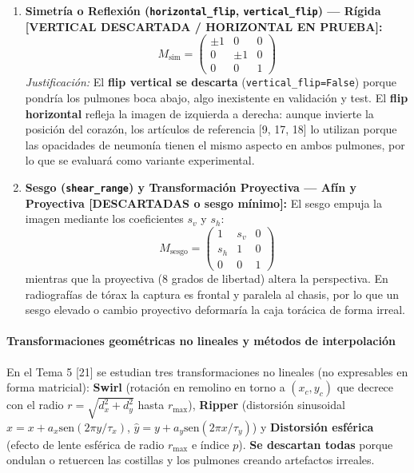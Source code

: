 \documentclass[11pt, a4paper]{article}
\numberwithin{equation}{section}
\begin{document}
\begin{enumerate}
    \item \textbf{Simetría o Reflexión (\texttt{horizontal\_flip}, \texttt{vertical\_flip}) --- Rígida [VERTICAL DESCARTADA / HORIZONTAL EN PRUEBA]:}
    \begin{equation}
        M_{\text{sim}} = \begin{pmatrix} \pm 1 & 0 & 0 \\ 0 & \pm 1 & 0 \\ 0 & 0 & 1 \end{pmatrix}
    \end{equation}
    \textit{Justificación:} El \textbf{flip vertical se descarta} (\texttt{vertical\_flip=False}) porque pondría los pulmones boca abajo, algo inexistente en validación y test. El \textbf{flip horizontal} refleja la imagen de izquierda a derecha: aunque invierte la posición del corazón, los artículos de referencia [9, 17, 18] lo utilizan porque las opacidades de neumonía tienen el mismo aspecto en ambos pulmones, por lo que se evaluará como variante experimental.

    \item \textbf{Sesgo (\texttt{shear\_range}) y Transformación Proyectiva --- Afín y Proyectiva [DESCARTADAS o sesgo mínimo]:}
    El sesgo empuja la imagen mediante los coeficientes $s_v$ y $s_h$:
    \begin{equation}
        M_{\text{sesgo}} = \begin{pmatrix} 1 & s_v & 0 \\ s_h & 1 & 0 \\ 0 & 0 & 1 \end{pmatrix}
    \end{equation}
    mientras que la proyectiva (8 grados de libertad) altera la perspectiva. En radiografías de tórax la captura es frontal y paralela al chasis, por lo que un sesgo elevado o cambio proyectivo deformaría la caja torácica de forma irreal.
\end{enumerate}

\paragraph{Transformaciones geométricas no lineales y métodos de interpolación}
En el Tema 5 [21] se estudian tres transformaciones no lineales (no expresables en forma matricial): \textbf{Swirl} (rotación en remolino en torno a $(x_c, y_c)$ que decrece con el radio $r = \sqrt{d_x^2 + d_y^2}$ hasta $r_{\max}$), \textbf{Ripper} (distorsión sinusoidal $\hat{x} = x + a_x \text{sen}(2\pi y/\tau_x)$, $\hat{y} = y + a_y \text{sen}(2\pi x/\tau_y)$) y \textbf{Distorsión esférica} (efecto de lente esférica de radio $r_{\max}$ e índice $p$). \textbf{Se descartan todas} porque ondulan o retuercen las costillas y los pulmones creando artefactos irreales.
\end{document}
